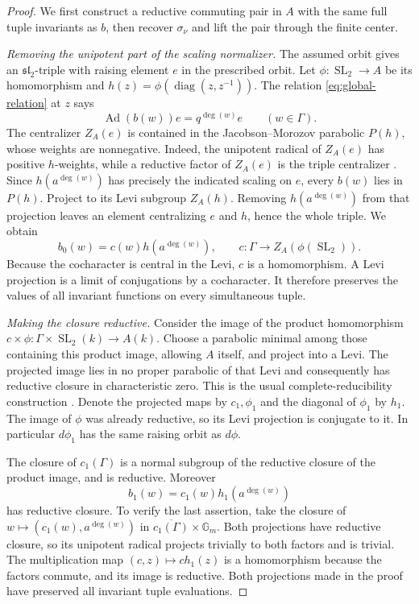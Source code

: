 \documentclass[11pt]{article}
\numberwithin{equation}{section}
\theoremstyle{definition}
\theoremstyle{remark}
\newcommand{\Ad}{\operatorname{Ad}}
\newcommand{\SL}{\operatorname{SL}}
\begin{document}
\begin{proof}
We first construct a reductive commuting pair in $A$ with the same
full tuple invariants as $b$, then recover $\sigma_\nu$ and lift
the pair through the finite center.

\emph{Removing the unipotent part of the scaling normalizer.}
The assumed orbit gives an $\mathfrak{sl}_2$-triple with raising
element $e$ in the prescribed orbit.  Let
$\phi:\SL_2\to A$ be its homomorphism and
$h(z)=\phi(\operatorname{diag}(z,z^{-1}))$.  The relation
\eqref{eq:global-relation} at $z$ says
\[
                 \Ad(b(w))e=q^{\deg(w)}e
                       \qquad(w\in\Gamma).
\]
The centralizer $Z_A(e)$ is contained in the Jacobson--Morozov
parabolic $P(h)$, whose weights are nonnegative.  Indeed, the
unipotent radical of $Z_A(e)$ has positive $h$-weights, while a
reductive factor of $Z_A(e)$ is the triple centralizer
\cite[Proposition~3.3]{global:BMYJM}.
Since
$h(a^{\deg(w)})$ has precisely the indicated scaling on $e$,
every $b(w)$ lies in $P(h)$.  Project to its Levi subgroup $Z_A(h)$.
Removing $h(a^{\deg(w)})$ from that projection leaves an element
centralizing $e$ and $h$, hence the whole triple.  We obtain
\[
                   b_0(w)=c(w)h(a^{\deg(w)}),
                 \qquad c:\Gamma\to Z_A(\phi(\SL_2)).
\]
Because the cocharacter is central in the Levi, $c$ is a
homomorphism.  A Levi projection is a limit of conjugations by a
cocharacter.  It therefore preserves the values of all invariant
functions on every simultaneous tuple.

\emph{Making the closure reductive.}
Consider the image of the product homomorphism
$c\times\phi:\Gamma\times\SL_2(k)\to A(k)$.
Choose a parabolic minimal among those containing this product image,
allowing $A$ itself,
and project into a Levi.  The projected image lies in no proper
parabolic of that Levi and consequently has reductive closure in
characteristic zero.  This is the usual complete-reducibility
construction
\cite[Corollary~3.5 and Example~4.8]{global:BMRSemisimplification}.
Denote the projected maps by
$c_1,\phi_1$ and the diagonal of $\phi_1$ by $h_1$.
The image of $\phi$ was already reductive, so its Levi projection
is conjugate to it.  In particular $d\phi_1$ has the same raising
orbit as $d\phi$.

The closure of $c_1(\Gamma)$ is a normal subgroup of the reductive
closure of the product image, and is reductive.  Moreover
\[
                    b_1(w)=c_1(w)h_1(a^{\deg(w)})
\]
has reductive closure.  To verify the last assertion, take the
closure of $w\mapsto(c_1(w),a^{\deg(w)})$ in
$\overline{c_1(\Gamma)}\times\mathbb G_m$.  Both projections
have reductive closure, so its unipotent radical projects trivially
to both factors and is trivial.  The multiplication map
$(c,z)\mapsto ch_1(z)$ is a homomorphism because the factors
commute, and its image is reductive.  Both projections made in the
proof have preserved all invariant tuple evaluations.


\end{proof}
\end{document}
